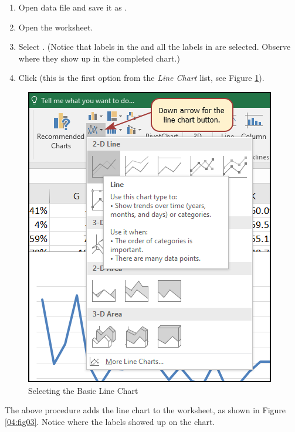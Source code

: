\begin{enumbox}
	\begin{enumerate}
		\item Open data file  and save it as .
		\item Open the  worksheet.
		\item Select . (Notice that labels in the  and all the labels in  are selected. Observe where they show up in the completed chart.)
		\item Click  (this is the first option from the \textit{Line Chart} list, see Figure \ref{04:fig02}).
	\end{enumerate}
\end{enumbox}
	
\begin{figure}[H]
	\centering
	\includegraphics[width=\maxwidth{.85\linewidth}]{gfx/ch04_fig02}
	\caption{Selecting the Basic Line Chart}
	\label{04:fig02}
\end{figure}

The above procedure adds the line chart to the worksheet, as shown in Figure \ref{04:fig03}. Notice where the labels showed up on the chart.


